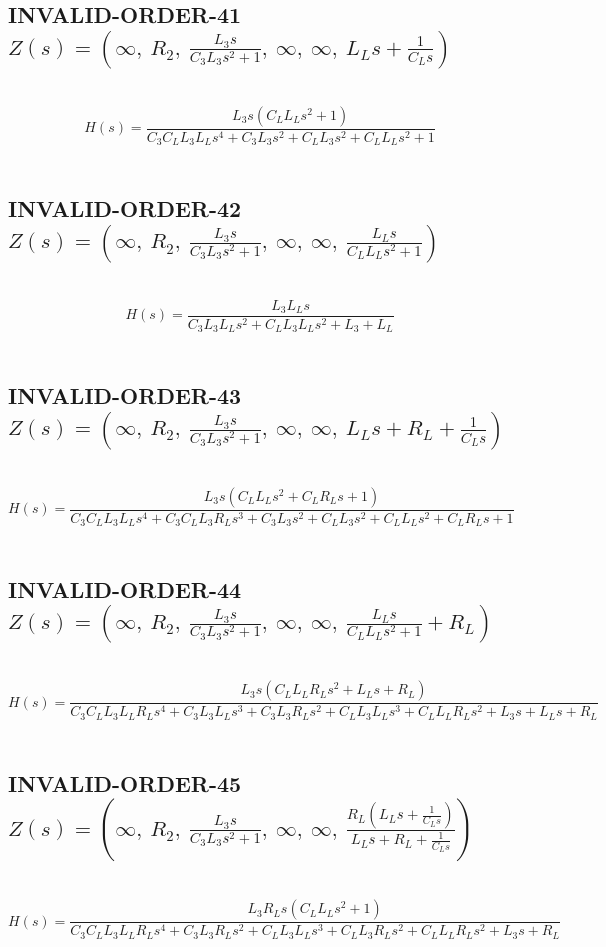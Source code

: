 \documentclass{article}
\begin{document}
\subsection{INVALID-ORDER-41 $Z(s) = \left( \infty, \  R_{2}, \  \frac{L_{3} s}{C_{3} L_{3} s^{2} + 1}, \  \infty, \  \infty, \  L_{L} s + \frac{1}{C_{L} s}\right)$ } \ 
\textbf{\[H(s) = \frac{L_{3} s \left(C_{L} L_{L} s^{2} + 1\right)}{C_{3} C_{L} L_{3} L_{L} s^{4} + C_{3} L_{3} s^{2} + C_{L} L_{3} s^{2} + C_{L} L_{L} s^{2} + 1}\] } \ 
\subsection{INVALID-ORDER-42 $Z(s) = \left( \infty, \  R_{2}, \  \frac{L_{3} s}{C_{3} L_{3} s^{2} + 1}, \  \infty, \  \infty, \  \frac{L_{L} s}{C_{L} L_{L} s^{2} + 1}\right)$ } \ 
\textbf{\[H(s) = \frac{L_{3} L_{L} s}{C_{3} L_{3} L_{L} s^{2} + C_{L} L_{3} L_{L} s^{2} + L_{3} + L_{L}}\] } \ 
\subsection{INVALID-ORDER-43 $Z(s) = \left( \infty, \  R_{2}, \  \frac{L_{3} s}{C_{3} L_{3} s^{2} + 1}, \  \infty, \  \infty, \  L_{L} s + R_{L} + \frac{1}{C_{L} s}\right)$ } \ 
\textbf{\[H(s) = \frac{L_{3} s \left(C_{L} L_{L} s^{2} + C_{L} R_{L} s + 1\right)}{C_{3} C_{L} L_{3} L_{L} s^{4} + C_{3} C_{L} L_{3} R_{L} s^{3} + C_{3} L_{3} s^{2} + C_{L} L_{3} s^{2} + C_{L} L_{L} s^{2} + C_{L} R_{L} s + 1}\] } \ 
\subsection{INVALID-ORDER-44 $Z(s) = \left( \infty, \  R_{2}, \  \frac{L_{3} s}{C_{3} L_{3} s^{2} + 1}, \  \infty, \  \infty, \  \frac{L_{L} s}{C_{L} L_{L} s^{2} + 1} + R_{L}\right)$ } \ 
\textbf{\[H(s) = \frac{L_{3} s \left(C_{L} L_{L} R_{L} s^{2} + L_{L} s + R_{L}\right)}{C_{3} C_{L} L_{3} L_{L} R_{L} s^{4} + C_{3} L_{3} L_{L} s^{3} + C_{3} L_{3} R_{L} s^{2} + C_{L} L_{3} L_{L} s^{3} + C_{L} L_{L} R_{L} s^{2} + L_{3} s + L_{L} s + R_{L}}\] } \ 
\subsection{INVALID-ORDER-45 $Z(s) = \left( \infty, \  R_{2}, \  \frac{L_{3} s}{C_{3} L_{3} s^{2} + 1}, \  \infty, \  \infty, \  \frac{R_{L} \left(L_{L} s + \frac{1}{C_{L} s}\right)}{L_{L} s + R_{L} + \frac{1}{C_{L} s}}\right)$ } \ 
\textbf{\[H(s) = \frac{L_{3} R_{L} s \left(C_{L} L_{L} s^{2} + 1\right)}{C_{3} C_{L} L_{3} L_{L} R_{L} s^{4} + C_{3} L_{3} R_{L} s^{2} + C_{L} L_{3} L_{L} s^{3} + C_{L} L_{3} R_{L} s^{2} + C_{L} L_{L} R_{L} s^{2} + L_{3} s + R_{L}}\] } \ 
\end{document}

